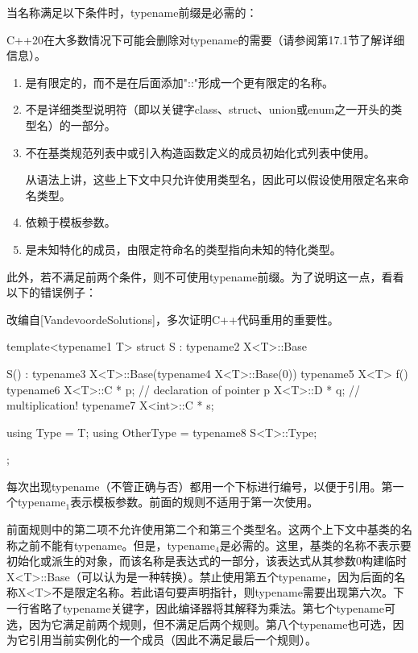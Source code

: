当名称满足以下条件时，typename前缀是必需的：

\begin{notice}
C++20在大多数情况下可能会删除对typename的需要（请参阅第17.1节了解详细信息）。
\end{notice}

\begin{enumerate}
\item 
是有限定的，而不是在后面添加"::"形成一个更有限定的名称。

\item 
不是详细类型说明符（即以关键字class、struct、union或enum之一开头的类型名）的一部分。

\item 
不在基类规范列表中或引入构造函数定义的成员初始化式列表中使用。

\begin{notice}
[colback=webgreen!5!white,colframe=webgreen!75!black]
从语法上讲，这些上下文中只允许使用类型名，因此可以假设使用限定名来命名类型。
\end{notice}

\item 
依赖于模板参数。

\item 
是未知特化的成员，由限定符命名的类型指向未知的特化类型。
\end{enumerate}

此外，若不满足前两个条件，则不可使用typename前缀。为了说明这一点，看看以下的错误例子：

\begin{notice}
改编自[VandevoordeSolutions]，多次证明C++代码重用的重要性。
\end{notice}

\begin{cpp}
template<typename1 T>
struct S : typename2 X<T>::Base {
	S() : typename3 X<T>::Base(typename4 X<T>::Base(0)) {
	}
	typename5 X<T> f() {
		typename6 X<T>::C * p; // declaration of pointer p
		X<T>::D * q; // multiplication!
	}
	typename7 X<int>::C * s;
	
	using Type = T;
	using OtherType = typename8 S<T>::Type;
};
\end{cpp}

每次出现typename（不管正确与否）都用一个下标进行编号，以便于引用。第一个typename$_1$表示模板参数。前面的规则不适用于第一次使用。

前面规则中的第二项不允许使用第二个和第三个类型名。这两个上下文中基类的名称之前不能有typename。但是，typename$_4$是必需的。这里，基类的名称不表示要初始化或派生的对象，而该名称是表达式的一部分，该表达式从其参数0构建临时X<T>::Base（可以认为是一种转换）。禁止使用第五个typename，因为后面的名称X<T>不是限定名称。若此语句要声明指针，则typename需要出现第六次。下一行省略了typename关键字，因此编译器将其解释为乘法。第七个typename可选，因为它满足前两个规则，但不满足后两个规则。第八个typename也可选，因为它引用当前实例化的一个成员（因此不满足最后一个规则）。

